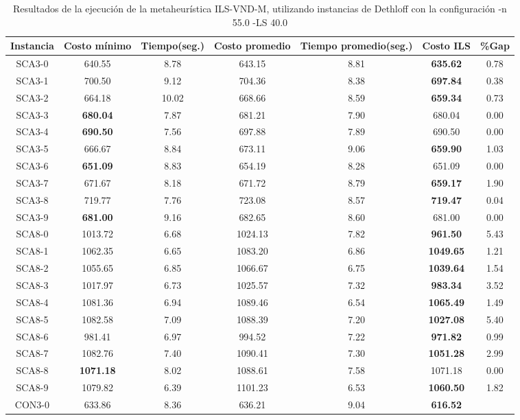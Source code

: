 \begin{table}[h]
\caption{Resultados de la ejecución de la metaheurística ILS-VND-M, utilizando instancias de Dethloff con la configuración -n 55.0 -LS 40.0}
\centering
\small
\begin{tabular}{c c c c c c c}
\hline\hline
Instancia & Costo mínimo & Tiempo(seg.) & Costo promedio & Tiempo promedio(seg.) & Costo ILS & \%Gap \\ [0.5ex]
\hline
SCA3-0 & 640.55 & 8.78 & 
643.15 & 8.81 & \bf{635.62} & 
0.78\\SCA3-1 & 700.50 & 9.12 & 
704.36 & 8.38 & \bf{697.84} & 
0.38\\SCA3-2 & 664.18 & 10.02 & 
668.66 & 8.59 & \bf{659.34} & 
0.73\\SCA3-3 & \bf{680.04} & 7.87 & 
681.21 & 7.90 & 680.04 & 0.00\\
SCA3-4 & \bf{690.50} & 7.56 & 
697.88 & 7.89 & 690.50 & 0.00\\
SCA3-5 & 666.67 & 8.84 & 
673.11 & 9.06 & \bf{659.90} & 
1.03\\SCA3-6 & \bf{651.09} & 8.83 & 
654.19 & 8.28 & 651.09 & 0.00\\
SCA3-7 & 671.67 & 8.18 & 
671.72 & 8.79 & \bf{659.17} & 
1.90\\SCA3-8 & 719.77 & 7.76 & 
723.08 & 8.57 & \bf{719.47} & 
0.04\\SCA3-9 & \bf{681.00} & 9.16 & 
682.65 & 8.60 & 681.00 & 0.00\\
SCA8-0 & 1013.72 & 6.68 & 
1024.13 & 7.82 & \bf{961.50} & 
5.43\\SCA8-1 & 1062.35 & 6.65 & 
1083.20 & 6.86 & \bf{1049.65} & 
1.21\\SCA8-2 & 1055.65 & 6.85 & 
1066.67 & 6.75 & \bf{1039.64} & 
1.54\\SCA8-3 & 1017.97 & 6.73 & 
1025.57 & 7.32 & \bf{983.34} & 
3.52\\SCA8-4 & 1081.36 & 6.94 & 
1089.46 & 6.54 & \bf{1065.49} & 
1.49\\SCA8-5 & 1082.58 & 7.09 & 
1088.39 & 7.20 & \bf{1027.08} & 
5.40\\SCA8-6 & 981.41 & 6.97 & 
994.52 & 7.22 & \bf{971.82} & 
0.99\\SCA8-7 & 1082.76 & 7.40 & 
1090.41 & 7.30 & \bf{1051.28} & 
2.99\\SCA8-8 & \bf{1071.18} & 8.02 & 
1088.61 & 7.58 & 1071.18 & 0.00\\
SCA8-9 & 1079.82 & 6.39 & 
1101.23 & 6.53 & \bf{1060.50} & 
1.82\\CON3-0 & 633.86 & 8.36 & 
636.21 & 9.04 & \bf{616.52} & 

\end{tabular}
\end{table}
